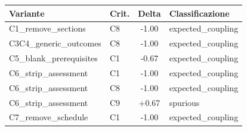 \begin{tabularx}{\textwidth}{l l S[table-format=+1.2] l}
  \toprule
  Variante & Crit. & {Delta} & Classificazione \\
  \midrule
  C1\_remove\_sections & C8 & -1.00 & expected_coupling \\
  C3C4\_generic\_outcomes & C8 & -1.00 & expected_coupling \\
  C5\_blank\_prerequisites & C1 & -0.67 & expected_coupling \\
  C6\_strip\_assessment & C1 & -1.00 & expected_coupling \\
  C6\_strip\_assessment & C8 & -1.00 & expected_coupling \\
  C6\_strip\_assessment & C9 & +0.67 & spurious \\
  C7\_remove\_schedule & C1 & -1.00 & expected_coupling \\
  \bottomrule
\end{tabularx}
